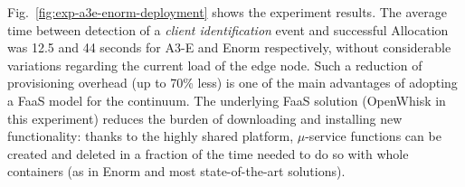 Fig.~\ref{fig:exp-a3e-enorm-deployment} shows the experiment results. The average time between detection of a \textit{client identification} event and successful Allocation was 12.5 and 44 seconds for A3-E and Enorm respectively, without considerable variations regarding the current load of the edge node. Such a reduction of provisioning overhead (up to 70\% less) is one of the main advantages of adopting a FaaS model for the continuum. The underlying FaaS solution (OpenWhisk in this experiment) reduces the burden of downloading and installing new functionality: thanks to the highly shared platform, $\mu$-service functions can be created and deleted in a fraction of the time needed to do so with whole containers (as in Enorm and most state-of-the-art solutions). 

